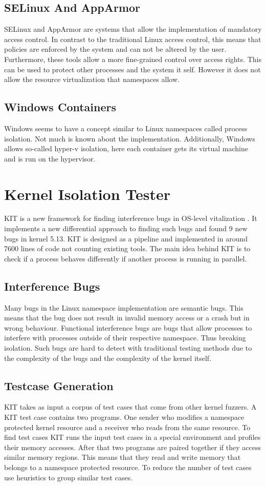 \documentclass[10pt,twocolumn,a4paper]{article}
\begin{document}
\subsection{SELinux And AppArmor}
SELinux and AppArmor are systems that allow the implementation of mandatory access control. In
contrast to the traditional Linux access control, this means that policies are enforced by the system
and can not be altered by the user. Furthermore, these tools allow a more fine-grained control over
access rights. This can be used  to protect other processes and the system it self. However it does not allow the resource
virtualization that namespaces allow\cite{26}\cite{27}. 
\subsection{Windows Containers}
Windows seems to have a concept similar to Linux namespaces called process isolation. Not much is known about the
implementation. Additionally, Windows allows so-called hyper-v isolation, here each container
gets its virtual machine and is run on the hypervisor\cite{3}.

\section{Kernel Isolation Tester}
KIT is a new framework for finding interference bugs in OS-level vitalization \cite{0}. 
It implements a new differential approach to finding such bugs and found 9 new bugs in kernel 5.13\cite{2}.
KIT is designed as a pipeline and implemented in around 7600 lines of code not counting existing tools\cite{0}.
The main idea behind KIT is to check if a process behaves differently if another process is running
in parallel.

\subsection{Interference Bugs}
Many bugs in the Linux namespace implementation are semantic bugs.
This means that the bug does not result in invalid memory access or a crash but in wrong behaviour. 
Functional interference bugs are bugs that allow processes to interfere with processes outside of their respective namespace.
Thus breaking isolation. Such bugs are hard to detect with traditional testing methods due to the complexity of the bugs and the complexity of the kernel itself. 

\subsection{Testcase Generation}
KIT takes as input a corpus of test cases that come from other kernel fuzzers.
A KIT test case contains two programs. One sender who modifies a namespace protected kernel
resource and a receiver who reads from the same resource. To find test cases KIT runs the input test cases in a special environment and profiles their memory accesses. 
After that two programs are paired together if they access similar memory regions. 
This means that they read and write memory that belongs to a namespace protected resource.
To reduce the number of test cases use heuristics to group similar test cases.
\end{document}
